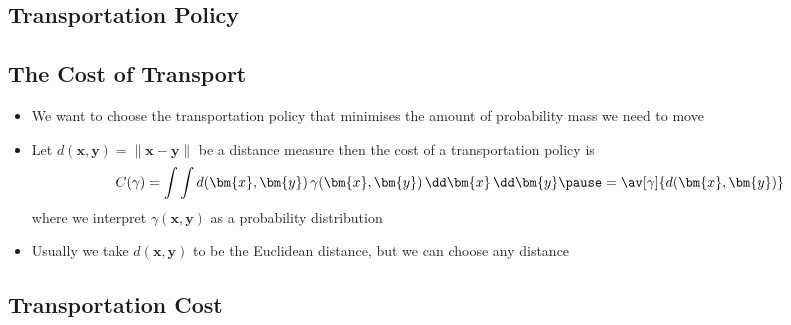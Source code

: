 
\begin{slide}
\section[-2]{Transportation Policy}

\pb
\pause{}
\begin{center}
  \pause
\end{center}
\end{slide}


\begin{slide}
\section{The Cost of Transport}

\begin{PauseHighLight}
  \begin{itemize}
  \item We want to choose the transportation policy that minimises the
    amount of probability mass we need to move\pause
  \item Let $d(\bm{x},\bm{y})=\|\bm{x}-\bm{y}\|$ be a distance measure
    then the cost of a transportation policy is
    \begin{align*}
      C(\gamma) = \int \int d(\bm{x},\bm{y})\,\gamma(\bm{x},\bm{y}) \,
      \dd\bm{x}\,\dd\bm{y}\pause = \av[\gamma]{d(\bm{x},\bm{y})}
    \end{align*}
    where we interpret $\gamma(\bm{x},\bm{y})$ as a probability
    distribution\pauseb
  \item Usually we take $d(\bm{x},\bm{y})$ to be the Euclidean
    distance, but we can choose any distance\pause
  \end{itemize}
\end{PauseHighLight}

\end{slide}


\begin{slide}
\section[-2]{Transportation Cost}

\pb
\pause{}
\begin{center}
  \pause
\end{center}
\end{slide}


